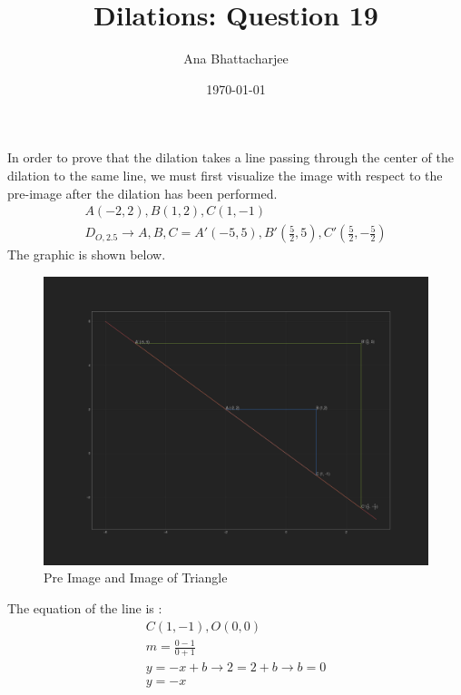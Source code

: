 \documentclass{article}
\begin{document}
\title{Dilations: Question 19}
\author{Ana Bhattacharjee}
\date{\today}
\maketitle{}


\begin{center}
In order to prove that the dilation takes a line passing through the center of the dilation to the same line, we must first visualize the image with respect to the pre-image after the dilation has been performed.
\begin{align}
  A(-2,2), B(1,2), C(1, -1) \\
  D_{O, 2.5} \rightarrow A,B,C = A' (-5, 5), B' (\frac{5}{2}, 5), C' (\frac{5}{2}, - \frac{5}{2})
\end{align}
The graphic is shown below.
\begin{figure}[!htbp]
  \includegraphics[width=1.0\columnwidth]{dilation}
  \caption{Pre Image and Image of Triangle}
\end{figure}
The equation of the line is :
\begin{align}
  C (1, -1) , O (0,0) \\
  m = \frac{0 -1}{0 + 1} \\
  y = -x + b \rightarrow 2 = 2 + b \rightarrow b = 0 \\
  y = -x
\end{align}
\end{center}
\end{document}
